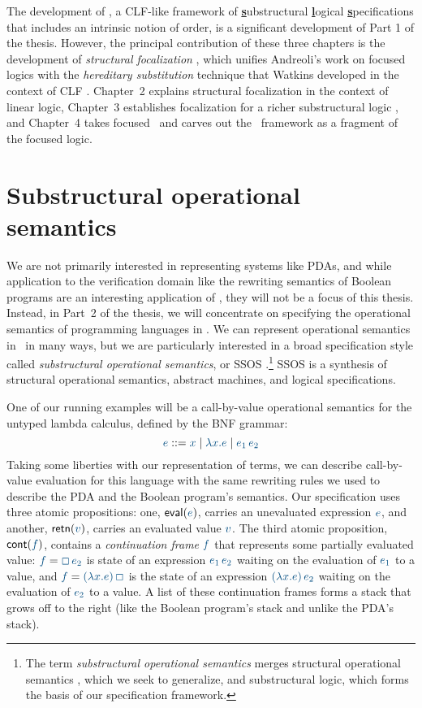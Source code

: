 The development of \sls, a CLF-like framework of \underline{\bf
  s}ubstructural \underline{\bf l}ogical \underline{\bf
  s}pecifications that includes an intrinsic notion of order, is a
significant development of Part 1 of the thesis.  However, the
principal contribution of these three chapters is the development of
{\it structural focalization} \cite{simmons11structural}, which
unifies Andreoli's work on focused logics \cite{andreoli92logic} with
the {\it hereditary substitution} technique that Watkins developed in
the context of CLF \cite{watkins02concurrent}. Chapter~2 explains
structural focalization in the context of linear logic, Chapter~3
establishes focalization for a richer substructural logic \ollll, and
Chapter~4 takes focused \ollll~and carves out the \sls~framework as a
fragment of the focused logic.

\section{Substructural operational semantics}
\label{sec:intro-ssos}

We are not primarily interested in representing systems like PDAs, and
while application to the verification domain like the rewriting
semantics of Boolean programs are an interesting application of \sls,
they will not be a focus of this thesis. Instead, in Part~2 of the
thesis, we will concentrate on specifying the operational semantics of
programming languages in \sls.
%
We can represent operational semantics in
\sls~in many ways, but we are particularly interested in a broad
specification style called {\it substructural operational semantics},
or SSOS
\cite{pfenning04substructural,pfenning09substructural}.\footnote{The
  term {\it substructural operational semantics} merges structural
  operational semantics \cite{plotkin04structural}, which we seek to
  generalize, and substructural logic, which forms the basis of our
  specification framework.} SSOS is a synthesis of structural
operational semantics, abstract machines, and logical specifications.

One of our running
examples will be a call-by-value operational semantics for the untyped
lambda calculus, defined by the BNF grammar:
\[
\obj{e} ::= \obj{x} \mid \obj{\lambda x.e} \mid \obj{e_1\,e_2}
\]
Taking some liberties with our representation of terms, we can
describe call-by-value evaluation for this language with the same
rewriting rules we used to describe the PDA and the Boolean program's
semantics. Our specification uses three atomic propositions: one,
${\sf eval}(\obj{e})$, carries an unevaluated expression $\obj{e}$,
and another, ${\sf retn}(\obj{v})$, carries an evaluated value
$\obj{v}$.  The third atomic proposition, ${\sf cont}(\obj{f})$,
contains a {\it continuation frame} $\obj{f}$ that represents some
partially evaluated value: $\obj{f} = \obj{\Box\,e_2}$ is state of an
expression $\obj{e_1\,e_2}$ waiting on the evaluation of $\obj{e_1}$
to a value, and $\obj{f} = \obj{(\lambda x.e)\,\Box}$ is the state of
an expression $\obj{(\lambda x.e)\,e_2}$ waiting on the evaluation of
$\obj{e_2}$ to a value. A list of these continuation frames forms a
stack that grows off to the right (like the Boolean program's stack
and unlike the PDA's stack).


